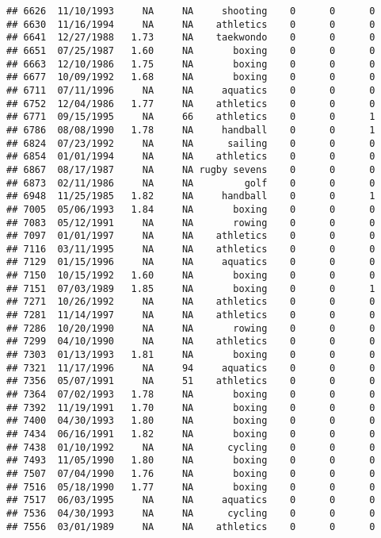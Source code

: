 \documentclass[]{article}
\begin{document}
\begin{verbatim}
## 6626  11/10/1993     NA     NA     shooting    0      0      0
## 6630  11/16/1994     NA     NA    athletics    0      0      0
## 6641  12/27/1988   1.73     NA    taekwondo    0      0      0
## 6651  07/25/1987   1.60     NA       boxing    0      0      0
## 6663  12/10/1986   1.75     NA       boxing    0      0      0
## 6677  10/09/1992   1.68     NA       boxing    0      0      0
## 6711  07/11/1996     NA     NA     aquatics    0      0      0
## 6752  12/04/1986   1.77     NA    athletics    0      0      0
## 6771  09/15/1995     NA     66    athletics    0      0      1
## 6786  08/08/1990   1.78     NA     handball    0      0      1
## 6824  07/23/1992     NA     NA      sailing    0      0      0
## 6854  01/01/1994     NA     NA    athletics    0      0      0
## 6867  08/17/1987     NA     NA rugby sevens    0      0      0
## 6873  02/11/1986     NA     NA         golf    0      0      0
## 6948  11/25/1985   1.82     NA     handball    0      0      1
## 7005  05/06/1993   1.84     NA       boxing    0      0      0
## 7083  05/12/1991     NA     NA       rowing    0      0      0
## 7097  01/01/1997     NA     NA    athletics    0      0      0
## 7116  03/11/1995     NA     NA    athletics    0      0      0
## 7129  01/15/1996     NA     NA     aquatics    0      0      0
## 7150  10/15/1992   1.60     NA       boxing    0      0      0
## 7151  07/03/1989   1.85     NA       boxing    0      0      1
## 7271  10/26/1992     NA     NA    athletics    0      0      0
## 7281  11/14/1997     NA     NA    athletics    0      0      0
## 7286  10/20/1990     NA     NA       rowing    0      0      0
## 7299  04/10/1990     NA     NA    athletics    0      0      0
## 7303  01/13/1993   1.81     NA       boxing    0      0      0
## 7321  11/17/1996     NA     94     aquatics    0      0      0
## 7356  05/07/1991     NA     51    athletics    0      0      0
## 7364  07/02/1993   1.78     NA       boxing    0      0      0
## 7392  11/19/1991   1.70     NA       boxing    0      0      0
## 7400  04/30/1993   1.80     NA       boxing    0      0      0
## 7434  06/16/1991   1.82     NA       boxing    0      0      0
## 7438  01/10/1992     NA     NA      cycling    0      0      0
## 7493  11/05/1990   1.80     NA       boxing    0      0      0
## 7507  07/04/1990   1.76     NA       boxing    0      0      0
## 7516  05/18/1990   1.77     NA       boxing    0      0      0
## 7517  06/03/1995     NA     NA     aquatics    0      0      0
## 7536  04/30/1993     NA     NA      cycling    0      0      0
## 7556  03/01/1989     NA     NA    athletics    0      0      0

\end{verbatim}
\end{document}
